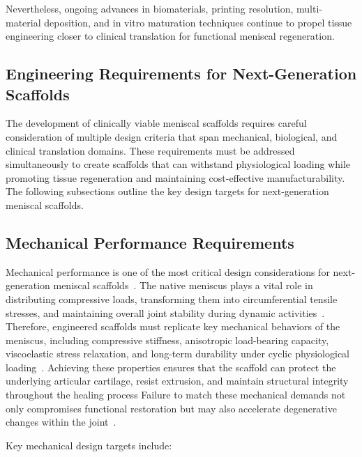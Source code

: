 Nevertheless, ongoing advances in biomaterials, printing resolution, multi-material deposition, and in vitro maturation techniques continue to propel tissue engineering closer to clinical translation for functional meniscal regeneration.

\subsection{Engineering Requirements for Next-Generation Scaffolds}

The development of clinically viable meniscal scaffolds requires careful consideration of multiple design criteria that span mechanical, biological, and clinical translation domains. These requirements must be addressed simultaneously to create scaffolds that can withstand physiological loading while promoting tissue regeneration and maintaining cost-effective manufacturability. The following subsections outline the key design targets for next-generation meniscal scaffolds.

\subsection{Mechanical Performance Requirements}

Mechanical performance is one of the most critical design considerations for next-generation meniscal scaffolds~\cite{sun2017overviewscaffold, gupta2020meniscaltissue, ma2025structurallysophisticated}.
The native meniscus plays a vital role in distributing compressive loads, transforming them into circumferential tensile stresses, and maintaining overall joint stability during dynamic activities~\cite{makris2011kneemeniscus}.
Therefore, engineered scaffolds must replicate key mechanical behaviors of the meniscus, including compressive stiffness, anisotropic load-bearing capacity, viscoelastic stress relaxation, and long-term durability under cyclic physiological loading~\cite{seitz2013stressrelaxationresponse, a.murphy20243dprintedvariable, sun2017overviewscaffold}.
Achieving these properties ensures that the scaffold can protect the underlying articular cartilage, resist extrusion, and maintain structural integrity throughout the healing process\cite{patel2018tissueengineeredtotal, sun2017overviewscaffold}
Failure to match these mechanical demands not only compromises functional restoration but may also accelerate degenerative changes within the joint~\cite{ghodbane2019partialmeniscus, makris2011kneemeniscus}.

Key mechanical design targets include:

